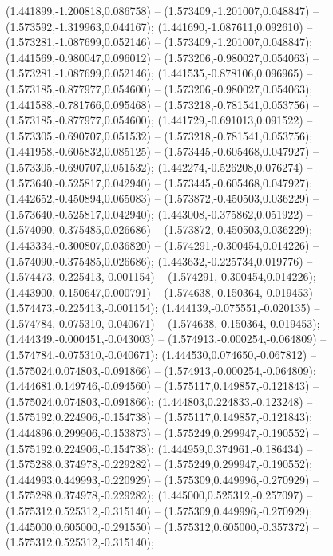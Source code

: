  (1.441899,-1.200818,0.086758) -- (1.573409,-1.201007,0.048847) -- (1.573592,-1.319963,0.044167);
 (1.441690,-1.087611,0.092610) -- (1.573281,-1.087699,0.052146) -- (1.573409,-1.201007,0.048847);
 (1.441569,-0.980047,0.096012) -- (1.573206,-0.980027,0.054063) -- (1.573281,-1.087699,0.052146);
 (1.441535,-0.878106,0.096965) -- (1.573185,-0.877977,0.054600) -- (1.573206,-0.980027,0.054063);
 (1.441588,-0.781766,0.095468) -- (1.573218,-0.781541,0.053756) -- (1.573185,-0.877977,0.054600);
 (1.441729,-0.691013,0.091522) -- (1.573305,-0.690707,0.051532) -- (1.573218,-0.781541,0.053756);
 (1.441958,-0.605832,0.085125) -- (1.573445,-0.605468,0.047927) -- (1.573305,-0.690707,0.051532);
 (1.442274,-0.526208,0.076274) -- (1.573640,-0.525817,0.042940) -- (1.573445,-0.605468,0.047927);
 (1.442652,-0.450894,0.065083) -- (1.573872,-0.450503,0.036229) -- (1.573640,-0.525817,0.042940);
 (1.443008,-0.375862,0.051922) -- (1.574090,-0.375485,0.026686) -- (1.573872,-0.450503,0.036229);
 (1.443334,-0.300807,0.036820) -- (1.574291,-0.300454,0.014226) -- (1.574090,-0.375485,0.026686);
 (1.443632,-0.225734,0.019776) -- (1.574473,-0.225413,-0.001154) -- (1.574291,-0.300454,0.014226);
 (1.443900,-0.150647,0.000791) -- (1.574638,-0.150364,-0.019453) -- (1.574473,-0.225413,-0.001154);
 (1.444139,-0.075551,-0.020135) -- (1.574784,-0.075310,-0.040671) -- (1.574638,-0.150364,-0.019453);
 (1.444349,-0.000451,-0.043003) -- (1.574913,-0.000254,-0.064809) -- (1.574784,-0.075310,-0.040671);
 (1.444530,0.074650,-0.067812) -- (1.575024,0.074803,-0.091866) -- (1.574913,-0.000254,-0.064809);
 (1.444681,0.149746,-0.094560) -- (1.575117,0.149857,-0.121843) -- (1.575024,0.074803,-0.091866);
 (1.444803,0.224833,-0.123248) -- (1.575192,0.224906,-0.154738) -- (1.575117,0.149857,-0.121843);
 (1.444896,0.299906,-0.153873) -- (1.575249,0.299947,-0.190552) -- (1.575192,0.224906,-0.154738);
 (1.444959,0.374961,-0.186434) -- (1.575288,0.374978,-0.229282) -- (1.575249,0.299947,-0.190552);
 (1.444993,0.449993,-0.220929) -- (1.575309,0.449996,-0.270929) -- (1.575288,0.374978,-0.229282);
 (1.445000,0.525312,-0.257097) -- (1.575312,0.525312,-0.315140) -- (1.575309,0.449996,-0.270929);
 (1.445000,0.605000,-0.291550) -- (1.575312,0.605000,-0.357372) -- (1.575312,0.525312,-0.315140);
